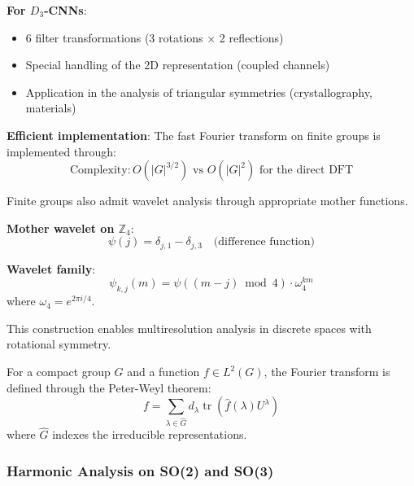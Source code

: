 \textbf{For $D_3$-CNNs}:
\begin{itemize}
    \item 6 filter transformations (3 rotations $\times$ 2 reflections)
    \item Special handling of the 2D representation (coupled channels)
    \item Application in the analysis of triangular symmetries (crystallography, materials)
\end{itemize}

\textbf{Efficient implementation}:
The fast Fourier transform on finite groups is implemented through:
\begin{equation}
\text{Complexity}: O(|G|^{3/2}) \text{ vs } O(|G|^2) \text{ for the direct DFT}
\end{equation}

\begin{example}\label{ex:wavelets_grupos_finitos}
Finite groups also admit wavelet analysis through appropriate mother functions.

\textbf{Mother wavelet on $\mathbb{Z}_4$}:
\begin{equation}
\psi(j) = \delta_{j,1} - \delta_{j,3} \quad \text{(difference function)}
\end{equation}

\textbf{Wavelet family}:
\begin{equation}
\psi_{k,j}(m) = \psi((m - j) \bmod 4) \cdot \omega_4^{km}
\end{equation}
where $\omega_4 = e^{2\pi i/4}$.

This construction enables multiresolution analysis in discrete spaces with rotational symmetry.
\end{example}

\begin{definition}\label{def:fourier_grupos_compactos}
For a compact group $G$ and a function $f \in L^2(G)$, the Fourier transform is defined through the Peter-Weyl theorem:
\begin{equation}
f = \sum_{\lambda \in \widehat{G}} d_\lambda \operatorname{tr}(\hat{f}(\lambda) U^\lambda)
\end{equation}
where $\widehat{G}$ indexes the irreducible representations.
\end{definition}

\subsubsection{Harmonic Analysis on SO(2) and SO(3)}

